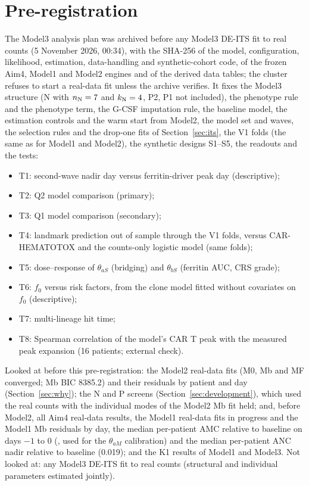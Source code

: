 \documentclass[11pt]{article}
\begin{document}




\section{Pre-registration}\label{sec:prereg}
The Model3 analysis plan was archived before any Model3 DE-ITS fit to real counts (5 November 2026, 00:34), with the SHA-256 of the model, configuration, likelihood, estimation, data-handling and synthetic-cohort code, of the frozen Aim4, Model1 and Model2 engines and of the derived data tables; the cluster refuses to start a real-data fit unless the archive verifies. It fixes the Model3 structure (N with $n_{\mathrm{N}}=7$ and $k_{\mathrm{N}}=4$, P2, P1 not included), the phenotype rule and the phenotype term, the G-CSF imputation rule, the baseline model, the estimation controls and the warm start from Model2, the model set and waves, the selection rules and the drop-one fits of Section~\ref{sec:its}, the V1 folds (the same as for Model1 and Model2), the synthetic designs S1--S5, the readouts and the tests:
\begin{itemize}
\item T1: second-wave nadir day versus ferritin-driver peak day (descriptive);
\item T2: Q2 model comparison (primary);
\item T3: Q1 model comparison (secondary);
\item T4: landmark prediction out of sample through the V1 folds, versus CAR-HEMATOTOX and the counts-only logistic model (same folds);
\item T5: dose--response of $\theta_{aS}$ (bridging) and $\theta_{bS}$ (ferritin AUC, CRS grade);
\item T6: $f_0$ versus risk factors, from the clone model fitted without covariates on $f_0$ (descriptive);
\item T7: multi-lineage hit time;
\item T8: Spearman correlation of the model's CAR T peak with the measured peak expansion (16 patients; external check).
\end{itemize}
Looked at before this pre-registration: the Model2 real-data fits (M0, Mb and MF converged; Mb BIC 8385.2) and their residuals by patient and day (Section~\ref{sec:why}); the N and P screens (Section~\ref{sec:development}), which used the real counts with the individual modes of the Model2 Mb fit held; and, before Model2, all Aim4 real-data results, the Model1 real-data fits in progress and the Model1 Mb residuals by day, the median per-patient AMC relative to baseline on days $-1$ to 0 (\valAmcTarget, used for the $\theta_{aM}$ calibration) and the median per-patient ANC nadir relative to baseline (0.019); and the K1 results of Model1 and Model3. Not looked at: any Model3 DE-ITS fit to real counts (structural and individual parameters estimated jointly).
\end{document}
